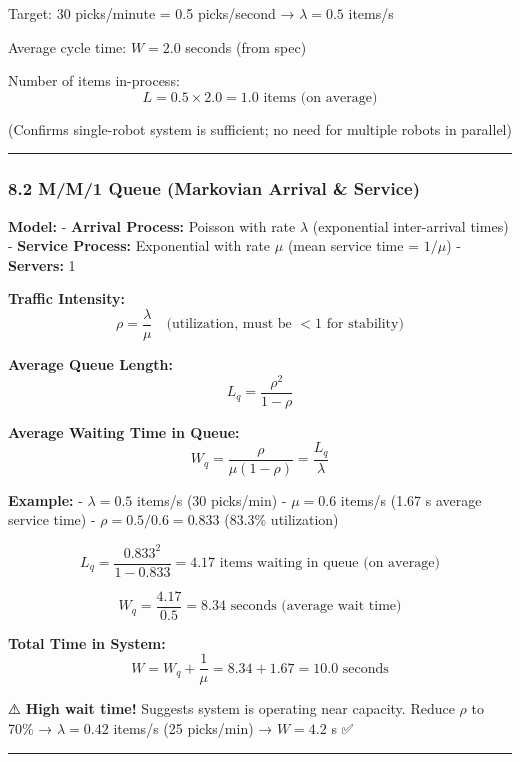 \documentclass[
]{article}
\begin{document}
Target: 30 picks/minute = 0.5 picks/second → \(\lambda = 0.5\) items/s

Average cycle time: \(W = 2.0\) seconds (from spec)

Number of items in-process: \[
L = 0.5 \times 2.0 = 1.0 \text{ items (on average)}
\]

(Confirms single-robot system is sufficient; no need for multiple robots
in parallel)

\begin{center}\rule{0.5\linewidth}{0.5pt}\end{center}

\hypertarget{mm1-queue-markovian-arrival-service}{%
\subsubsection{8.2 M/M/1 Queue (Markovian Arrival \&
Service)}\label{mm1-queue-markovian-arrival-service}}

\textbf{Model:} - \textbf{Arrival Process:} Poisson with rate
\(\lambda\) (exponential inter-arrival times) - \textbf{Service
Process:} Exponential with rate \(\mu\) (mean service time = \(1/\mu\))
- \textbf{Servers:} 1

\textbf{Traffic Intensity:} \[
\rho = \frac{\lambda}{\mu} \quad \text{(utilization, must be } < 1 \text{ for stability)}
\]

\textbf{Average Queue Length:} \[
L_q = \frac{\rho^2}{1 - \rho}
\]

\textbf{Average Waiting Time in Queue:} \[
W_q = \frac{\rho}{\mu(1 - \rho)} = \frac{L_q}{\lambda}
\]

\textbf{Example:} - \(\lambda = 0.5\) items/s (30 picks/min) -
\(\mu = 0.6\) items/s (1.67 s average service time) -
\(\rho = 0.5/0.6 = 0.833\) (83.3\% utilization)

\[
L_q = \frac{0.833^2}{1 - 0.833} = 4.17 \text{ items waiting in queue (on average)}
\]

\[
W_q = \frac{4.17}{0.5} = 8.34 \text{ seconds (average wait time)}
\]

\textbf{Total Time in System:} \[
W = W_q + \frac{1}{\mu} = 8.34 + 1.67 = 10.0 \text{ seconds}
\]

⚠️ \textbf{High wait time!} Suggests system is operating near capacity.
Reduce \(\rho\) to 70\% → \(\lambda = 0.42\) items/s (25 picks/min) →
\(W = 4.2\) s ✅

\begin{center}\rule{0.5\linewidth}{0.5pt}\end{center}
\end{document}
